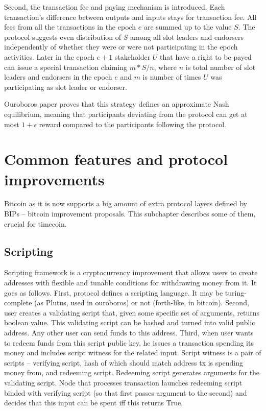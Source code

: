 \documentclass[]{itmo-student-thesis}
\begin{document}
Second, the transaction fee and paying mechanism is introduced. Each
transaction’s difference between outputs and inputs stays for
transaction fee. All fees from all the transactions in the epoch $e$
are summed up to the value $S$. The protocol suggests even
distribution of $S$ among all slot leaders and endorsers independently
of whether they were or were not participating in the epoch
activities. Later in the epoch $e+1$ stakeholder $U$ that have a right
to be payed can issue a special transaction claiming $m * S / n$,
where $n$ is total number of slot leaders and endorsers in the epoch
$e$ and $m$ is number of times $U$ was participating as slot leader or
endorser.

Ouroboros paper proves that this strategy defines an approximate Nash
equilibrium, meaning that participants deviating from the protocol can
get at most $1 + \epsilon$ reward compared to the participants following
the protocol.

\section{Common features and protocol improvements}

Bitcoin as it is now supports a big amount of extra protocol layers
defined by BIPs -- bitcoin improvement proposals. This subchapter
describes some of them, crucial for timecoin.

\subsection{Scripting}

Scripting framework is a cryptocurrency improvement that allows users
to create addresses with flexible and tunable conditions for
withdrawing money from it. It goes as follows. First, protocol defines
a scripting language. It may be turing-complete (as Plutus, used in
ouroboros) or not (forth-like, in bitcoin). Second, user creates a
validating script that, given some specific set of arguments, returns
boolean value. This validating script can be hashed and turned into
valid public address. Any other user can send funds to this
address. Third, when user wants to redeem funds from this script
public key, he issues a transaction spending its money and includes
script witness for the related input. Script witness is a pair of
scripts -- verifying script, hash of which should match address tx is
spending money from, and redeeming script. Redeeming script generates
arguments for the validating script. Node that processes transaction
launches redeeming script binded with verifying script (so that first
passes argument to the second) and decides that this input can be
spent iff this returns True.
\end{document}
